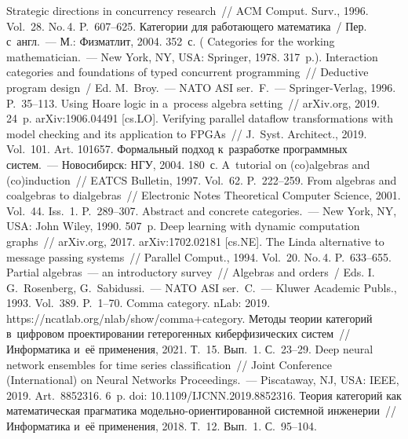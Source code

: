 \begin{multicols}{2}
{\small\frenchspacing
 {%
 \begin{thebibliography}{99}
 Strategic directions in concurrency research~// ACM Comput. 
Surv., 1996. Vol.~28. No.\,4. P.~607--625.
 Категории для ра\-бо\-та\-юще\-го математика~/ Пер. с~англ.~--- М.: Физматлит, 
2004. 352~с. ( Categories for the working mathematician.~--- New York, NY, 
USA: Springer, 1978. 317~p.).
 Interaction categories and foundations of typed 
concurrent programming~// Deductive program design~/ Ed. M.~Broy.~--- 
NATO ASI ser.~F.~--- Springer-Verlag, 1996. P.~35--113.
 Using Hoare logic in a~process algebra setting~// 
arXiv.org, 2019. 24~p. \mbox{arXiv}:1906.04491 [cs.LO].
 Verifying 
parallel dataflow transformations with model checking and its application to FPGAs~// J.~Syst. 
Architect., 2019. Vol.~101. Art. 101657.
 Формальный подход к~разработке программных сис\-тем.~--- 
Новосибирск: НГУ, 2004. 180~с.
 A~tutorial on (co)algebras and (co)induction~// EATCS Bulletin, 1997. 
Vol.~62. P.~222--259.
 From algebras and coalgebras to dialgebras~// Electronic Notes  
Theoretical Computer Science, 2001. Vol.~44. Iss.~1. P.~289--307.
 Abstract and concrete 
categories.~--- New York, NY, USA: John Wiley, 1990. 507~p.
 Deep learning with dynamic computation 
graphs~// arXiv.org, 2017. arXiv:1702.02181 [cs.NE].
 The Linda alternative to 
message passing systems~// Parallel Comput., 1994. Vol.~20. No.\,4. P.~633--655.
 Partial algebras~--- an introductory survey~// Algebras and orders~/ Eds. 
I.\,G.~Rosenberg, G.~Sabidussi.~--- NATO ASI ser.~C.~--- Kluwer Academic Publs., 1993. Vol.~389. P.~1--70.
Comma category. nLab: 2019. {\sf https://ncatlab.org/nlab/\linebreak show/comma+category}.
 Методы теории категорий в~цифровом проектировании гетерогенных 
киберфизических сис\-тем~// Информатика и~её применения, 2021. Т.~15. Вып.~1. С.~23--29.
 Deep neural network 
ensembles for time series classification~// Joint Conference (International) on Neural Networks 
Proceedings.~--- Piscataway, NJ, USA: IEEE, 2019. Art.\ 8852316. 6~p. doi: 
10.1109/IJCNN.2019.8852316.
 Теория категорий как математическая прагматика  
мо\-дель\-но-ори\-ен\-ти\-ро\-ван\-ной сис\-тем\-ной инженерии~// Информатика и~её 
применения, 2018. Т.~12. Вып.~1. С.~95--104.
\end{thebibliography}

}}
\end{multicols}
